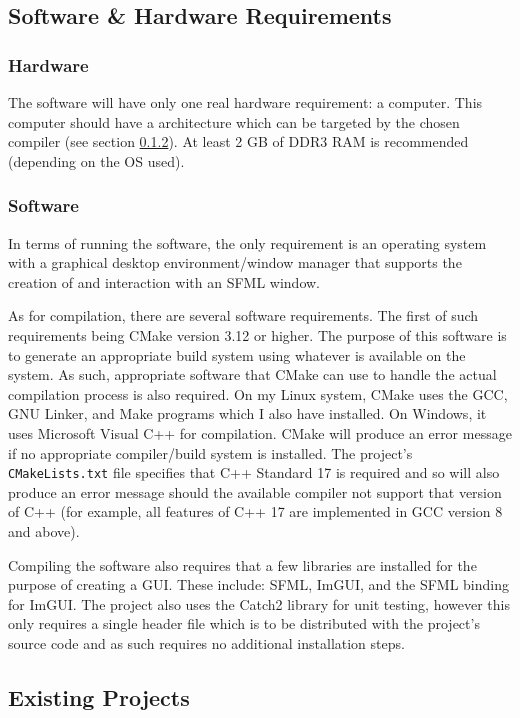 \subsection{Software \& Hardware Requirements}
    \subsubsection{Hardware}
        The software will have only one real hardware requirement: a computer. This computer should have a architecture which can be targeted by the chosen compiler (see section \ref{sec:software-require}). At least 2 GB of DDR3 RAM is recommended (depending on the OS used).

    \subsubsection{Software} \label{sec:software-require}
        In terms of running the software, the only requirement is an operating system with a graphical desktop environment/window manager that supports the creation of and interaction with an SFML window.

        As for compilation, there are several software requirements. The first of such requirements being CMake version 3.12 or higher. The purpose of this software is to generate an appropriate build system using whatever is available on the system. As such, appropriate software that CMake can use to handle the actual compilation process is also required. On my Linux system, CMake uses the GCC, GNU Linker, and Make programs which I also have installed. On Windows, it uses Microsoft Visual C++ for compilation. CMake will produce an error message if no appropriate compiler/build system is installed. The project's \texttt{CMakeLists.txt} file specifies that C++ Standard 17 is required and so will also produce an error message should the available compiler not support that version of C++ (for example, all features of C++ 17 are implemented in GCC version 8 and above).

        Compiling the software also requires that a few libraries are installed for the purpose of creating a GUI. These include: SFML, ImGUI, and the SFML binding for ImGUI. The project also uses the Catch2 library for unit testing, however this only requires a single header file which is to be distributed with the project's source code and as such requires no additional installation steps.

\subsection{Existing Projects}
